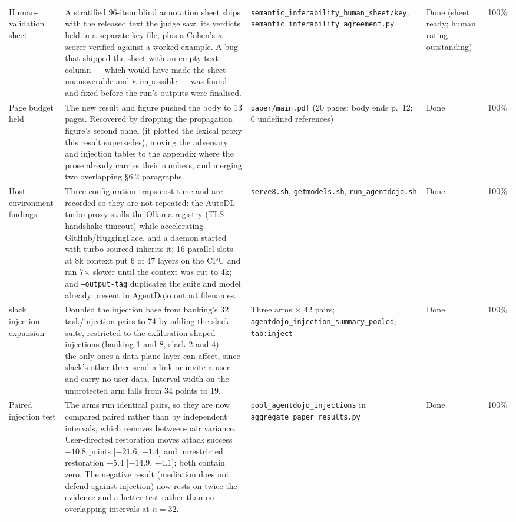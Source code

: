 \documentclass[11pt]{article}
\begin{document}
\begin{longtable}{p{}p{}p{}p{}p{}}
Human-validation sheet & A stratified 96-item blind annotation sheet ships with the released text the judge saw, its verdicts held in a separate key file, plus a Cohen's $\kappa$ scorer verified against a worked example. A bug that shipped the sheet with an empty text column --- which would have made the sheet unanswerable and $\kappa$ impossible --- was found and fixed before the run's outputs were finalised. & \texttt{semantic\_inferability\_human\_sheet/key}; \texttt{semantic\_inferability\_agreement.py} & Done (sheet ready; human rating outstanding) & 100\% \\
Page budget held & The new result and figure pushed the body to 13 pages. Recovered by dropping the propagation figure's second panel (it plotted the lexical proxy this result supersedes), moving the adversary and injection tables to the appendix where the prose already carries their numbers, and merging two overlapping \S6.2 paragraphs. & \texttt{paper/main.pdf} (20 pages; body ends p.~12; 0 undefined references) & Done & 100\% \\
Host-environment findings & Three configuration traps cost time and are recorded so they are not repeated: the AutoDL turbo proxy stalls the Ollama registry (TLS handshake timeout) while accelerating GitHub/HuggingFace, and a daemon started with turbo sourced inherits it; 16 parallel slots at 8k context put 6 of 47 layers on the CPU and ran 7$\times$ slower until the context was cut to 4k; and \texttt{--output-tag} duplicates the suite and model already present in AgentDojo output filenames. & \texttt{serve8.sh}, \texttt{getmodels.sh}, \texttt{run\_agentdojo.sh} & Done & 100\% \\
slack injection expansion & Doubled the injection base from banking's 32 task/injection pairs to 74 by adding the slack suite, restricted to the exfiltration-shaped injections (banking 1 and 8, slack 2 and 4) --- the only ones a data-plane layer can affect, since slack's other three send a link or invite a user and carry no user data. Interval width on the unprotected arm falls from 34 points to 19. & Three arms $\times$ 42 pairs; \texttt{agentdojo\_injection\_summary\_pooled}; \texttt{tab:inject} & Done & 100\% \\
Paired injection test & The arms run identical pairs, so they are now compared paired rather than by independent intervals, which removes between-pair variance. User-directed restoration moves attack success $-10.8$ points [$-21.6$, $+1.4$] and unrestricted restoration $-5.4$ [$-14.9$, $+4.1$]; both contain zero. The negative result (mediation does not defend against injection) now rests on twice the evidence and a better test rather than on overlapping intervals at $n{=}32$. & \texttt{pool\_agentdojo\_injections} in \texttt{aggregate\_paper\_results.py} & Done & 100\% \\

\end{longtable}
\end{document}
